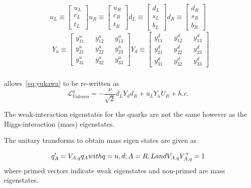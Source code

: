 \begin{equation}
  u_{L} \equiv \begin{bmatrix}u_{L}\\c_{L}\\t_{L}\end{bmatrix}
  u_{R} \equiv \begin{bmatrix}u_{R}\\c_{R}\\t_{R}\end{bmatrix}
  d_{L} \equiv \begin{bmatrix}d_{L}\\s_{L}\\b_{L}\end{bmatrix}
  d_{R} \equiv \begin{bmatrix}d_{R}\\s_{R}\\b_{R}\end{bmatrix}
  \label{eq:yukdef1}
\end{equation}
\begin{equation}
  \begin{split}
    &
    Y_{u} \equiv \begin{bmatrix}y^{u}_{11}&&y^{u}_{12}&&y^{u}_{13}\\y^{u}_{21}&&y^{u}_{22}&&y^{u}_{23}\\y^{u}_{31}&&y^{u}_{32}&&y^{u}_{33}\end{bmatrix}
    Y_{d} \equiv \begin{bmatrix}y^{d}_{11}&&y^{d}_{12}&&y^{d}_{13}\\y^{d}_{21}&&y^{d}_{22}&&y^{d}_{23}\\y^{d}_{31}&&y^{d}_{32}&&y^{d}_{33}\end{bmatrix}
    \\
  \end{split}
\end{equation}

allows~\autoref{eq:yukawa} to be re-written as
\begin{equation}
  \mathcal{L}^{q}_{Yukawa} = -\frac{\nu}{\sqrt{2}}{\overline{d}_{L}Y_{d}d_{R} + \overline{u}_{L}Y_{u}U_{R} + h.c.}
\end{equation}


The weak-interaction eigenstates for the quarks are not the same however as the Higgs-interaction (mass) eigenstates.

The unitary transforms to obtain mass eigen states are given as

\begin{equation}
  q^{\prime}_{A} = V_{A,q}q_{A} $$with$$ q = u,d;   A = R,L $$and$$ V_{A,q}V^{+}_{A,q} = 1
  \label{eq:yukdef2}
\end{equation}
where primed vectors indicate weak eigenstates and non-primed are mass eigenstates.

